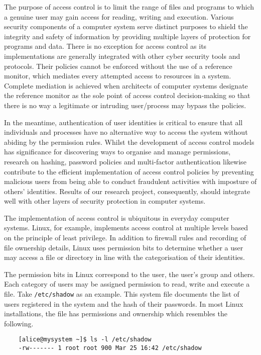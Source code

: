 \documentclass{article}
\begin{document}
The purpose of access control is to limit the range of files and programs to which a genuine user may gain access for reading, writing and execution. Various security components of a computer system serve distinct purposes to shield the integrity and safety of information by providing multiple layers of protection for programs and data. There is no exception for access control as its implementations are generally integrated with other cyber security tools and protocols. Their policies cannot be enforced without the use of a reference monitor, which mediates every attempted access to resources in a system.\cite{principles} Complete mediation is achieved when architects of computer systems designate the reference monitor as the sole point of access control decision-making so that there is no way a legitimate or intruding user/process may bypass the policies.

In the meantime, authentication of user identities is critical to ensure that all individuals and processes have no alternative way to access the system without abiding by the permission rules. Whilst the development of access control models has significance for discovering ways to organise and manage permissions, research on hashing, password policies and multi-factor authentication likewise contribute to the efficient implementation of access control policies by preventing malicious users from being able to conduct fraudulent activities with imposture of others' identities. Results of our research project, consequently, should integrate well with other layers of security protection in computer systems.

The implementation of access control is ubiquitous in everyday computer systems. Linux, for example, implements access control at multiple levels based on the principle of least privilege. In addition to firewall rules and recording of file ownership details, Linux uses permission bits to determine whether a user may access a file or directory in line with the categorisation of their identities.

The permission bits in Linux correspond to the user, the user's group and others. Each category of users may be assigned permission to read, write and execute a file.\cite{access-control-assessment} Take \texttt{/etc/shadow} as an example. This system file documents the list of users registered in the system and the hash of their passwords. In most Linux installations, the file has permissions and ownership which resembles the following.

\begin{verbatim}
    [alice@mysystem ~]$ ls -l /etc/shadow
    -rw------- 1 root root 900 Mar 25 16:42 /etc/shadow
\end{verbatim}
\end{document}
